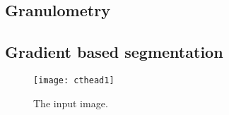 \documentclass{InsightArticle}
\begin{document}
  \subsection{Granulometry}

  \subsection{Gradient based segmentation}







\begin{figure}[htbp]
\centering
\texttt{[image: cthead1]}
\caption{The input image.\label{cthead1}}
\end{figure}


\appendix





\nocite{ITKSoftwareGuide}
\end{document}
